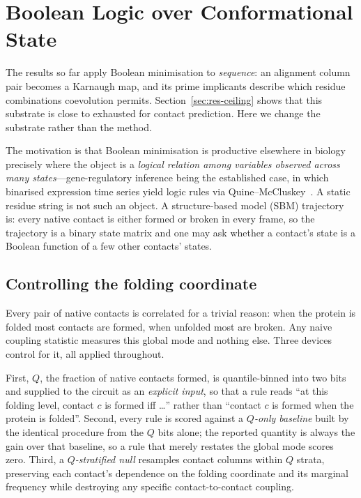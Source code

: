 \section{Boolean Logic over Conformational State}
\label{sec:res-contact-logic}

The results so far apply Boolean minimisation to \emph{sequence}: an alignment
column pair becomes a Karnaugh map, and its prime implicants describe which
residue combinations coevolution permits.  Section~\ref{sec:res-ceiling} shows
that this substrate is close to exhausted for contact prediction.  Here we
change the substrate rather than the method.

The motivation is that Boolean minimisation is productive elsewhere in biology
precisely where the object is a \emph{logical relation among variables observed
across many states}---gene-regulatory inference being the established case, in
which binarised expression time series yield logic rules via
Quine--McCluskey~\cite{kocevar2024sailor}.  A static residue string is not such
an object.  A structure-based model (SBM) trajectory~\cite{clementi2000sbm}
is: every native contact is either formed or broken in every frame, so the
trajectory is a binary state matrix and one may ask whether a contact's state
is a Boolean function of a few other contacts' states.

\subsection{Controlling the folding coordinate}
\label{sec:cl-control}

Every pair of native contacts is correlated for a trivial reason: when the
protein is folded most contacts are formed, when unfolded most are broken.  Any
naive coupling statistic measures this global mode and nothing else.  Three
devices control for it, all applied throughout.

First, $Q$, the fraction of native contacts formed, is quantile-binned into two
bits and supplied to the circuit as an \emph{explicit input}, so that a rule
reads ``at this folding level, contact $c$ is formed iff \dots'' rather than
``contact $c$ is formed when the protein is folded''.  Second, every rule is
scored against a \emph{$Q$-only baseline} built by the identical procedure from
the $Q$ bits alone; the reported quantity is always the gain over that
baseline, so a rule that merely restates the global mode scores zero.  Third, a
\emph{$Q$-stratified null} resamples contact columns within $Q$ strata,
preserving each contact's dependence on the folding coordinate and its marginal
frequency while destroying any specific contact-to-contact coupling.

